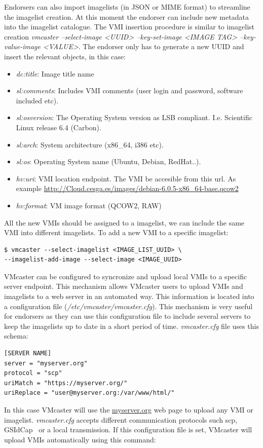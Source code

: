 \documentclass{cai}
\begin{document}
Endorsers can also import imagelists (in JSON or MIME format) to streamline the imagelist creation. At this moment the endorser can include new metadata into the imagelist catalogue.
The VMI insertion procedure is similar to imagelist creation \textit{vmcaster --select-image <UUID> --key-set-image <IMAGE TAG> --key-value-image <VALUE>}.  
The endorser only has to generate a new UUID and insert the relevant objects, in this case:
\begin{itemize}
 \item \textit{dc:title}: Image title name
 \item \textit{sl:comments}: Includes VMI comments (user login and password, software included etc).
 \item \textit{sl:osversion}: The Operating System version as LSB compliant. I.e. Scientific Linux release 6.4 (Carbon).
 \item \textit{sl:arch}: System architecture (x86\_64, i386 etc).
 \item \textit{sl:os}: Operating System name (Ubuntu, Debian, RedHat..).
 \item \textit{hv:uri}: VMI location endpoint. The VMI be accesible from this url. As example \url{http://Cloud.cesga.es/images/debian-6.0.5-x86_64-base.qcow2}
 \item \textit{hv:format}: VM image format (QCOW2, RAW)
\end{itemize}
All the new VMIs should be assigned to a imagelist, we can include the same VMI into different imagelists. To add a new VMI to a specific imagelist:

\begin{verbatim}
$ vmcaster --select-imagelist <IMAGE_LIST_UUID> \
--imagelist-add-image --select-image <IMAGE_UUID>
\end{verbatim}

VMcaster can be configured to syncronize and upload local VMIs to a specific server endpoint. This mechanism allows VMcaster users to upload VMIs and imagelists to a web server in an automated way.
This information is located into a configuration file (\textit{/etc/vmcaster/vmcaster.cfg}). This mechanism is very useful for endorsers as they can use this configuration file to include several servers to keep the imagelists up to date in a short period of time.
\textit{vmcaster.cfg} file uses this schema:
\begin{verbatim}
[SERVER NAME]
server = "myserver.org"
protocol = "scp"
uriMatch = "https://myserver.org/"
uriReplace = "user@myserver.org:/var/www/html/"
\end{verbatim}
In this case VMcaster will use the \url{myserver.org} web page to upload any VMI or imagelist. 
\textit{vmcaster.cfg} accepts different communication protocols such scp, GSIdCap~\cite{dcache} or a local transmission. If this configuration file is set, VMcaster will upload VMIs automatically using this command:
\end{document}
